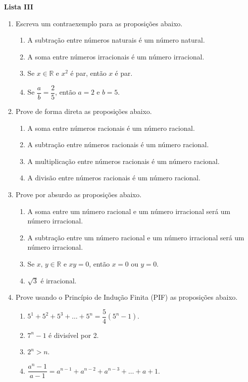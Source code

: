 \documentclass[12pt,a4paper]{article}
\begin{document}
\begin{center}
  \textbf{Lista III}
\end{center}

\begin{enumerate}
  \item Escreva um contraexemplo para as proposições abaixo.
  \begin{enumerate}
    \item A subtração entre números naturais é um número natural.
    \item A soma entre números irracionais é um número irracional.
    \item Se $x\in\mathbb{R}$ e $x^2$ é par, então $x$ é par.
    \item Se $\dfrac{a}{b} = \dfrac{2}{5}$, então $a = 2$ e $b = 5$.
  \end{enumerate}
  
  \item Prove de forma direta as proposições abaixo.
  \begin{enumerate}
    \item A soma entre números racionais é um número racional.
    \item A subtração entre números racionais é um número racional.
    \item A multiplicação entre números racionais é um número racional.
    \item A divisão entre números racionais é um número racional.
  \end{enumerate}
  
  \item Prove por absurdo as proposições abaixo.
  \begin{enumerate}
    \item A soma entre um número racional e um número irracional será um número irracional.
    \item A subtração entre um número racional e um número irracional será um número irracional.
    \item Se $x,\,y\in\mathbb{R}$ e $xy = 0$, então $x = 0$ ou $y = 0$.
    \item $\sqrt{3}$ é irracional.
  \end{enumerate}

  \item Prove usando o Princípio de Indução Finita (PIF) as proposições abaixo.
  \begin{enumerate}
    \item $5^1 + 5^2 + 5^3 + \ldots + 5^n = \dfrac{5}{4}\left(5^{n} - 1\right)$.
    \item $7^n - 1$ é divisível por 2.
    \item $2^n > n$.
    \item $\dfrac{a^n - 1}{a - 1} = a^{n - 1} + a^{n - 2} + a^{n - 3} + \ldots + a + 1$.
  \end{enumerate}
  
\end{enumerate}
\end{document}
